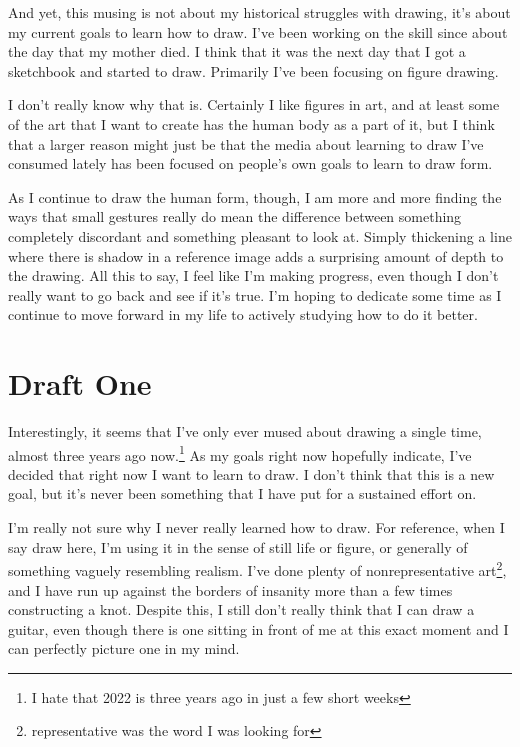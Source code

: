 \documentclass[12pt]{article}[titlepage]
\renewcommand{\,}{\textsuperscript{,}}
\begin{document}
And yet, this musing is not about my historical struggles with drawing, it's about my current goals to learn how to draw.  
I've been working on the skill since about the day that my mother died.  
I think that it was the next day that I got a sketchbook and started to draw.  
Primarily I've been focusing on figure drawing.

I don't really know why that is.  
Certainly I like figures in art, and at least some of the art that I want to create has the human body as a part of it, but I think that a larger reason might just be that the media about learning to draw I've consumed lately has been focused on people's own goals to learn to draw form.

As I continue to draw the human form, though, I am more and more finding the ways that small gestures really do mean the difference between something completely discordant and something pleasant to look at.  
Simply thickening a line where there is shadow in a reference image adds a surprising amount of depth to the drawing.  
All this to say, I feel like I'm making progress, even though I don't really want to go back and see if it's true.  
I'm hoping to dedicate some time as I continue to move forward in my life to actively studying how to do it better.

  


\section{Draft One}  


Interestingly, it seems that I've only ever mused about drawing a single time, almost three years ago now.\footnote{I hate that 2022 is three years ago in just a few short weeks}  
As my goals right now hopefully indicate, I've decided that right now I want to learn to draw.  
I don't think that this is a new goal, but it's never been something that I have put for a sustained effort on.

I'm really not sure why I never really learned how to draw.  
For reference, when I say draw here, I'm using it in the sense of still life or figure, or generally of something vaguely resembling realism.  
I've done plenty of non\-representative art\footnote{representative was the word I was looking for}, and I have run up against the borders of insanity more than a few times constructing a knot.  
Despite this, I still don't really think that I can draw a guitar, even though there is one sitting in front of me at this exact moment and I can perfectly picture one in my mind.
\end{document}

